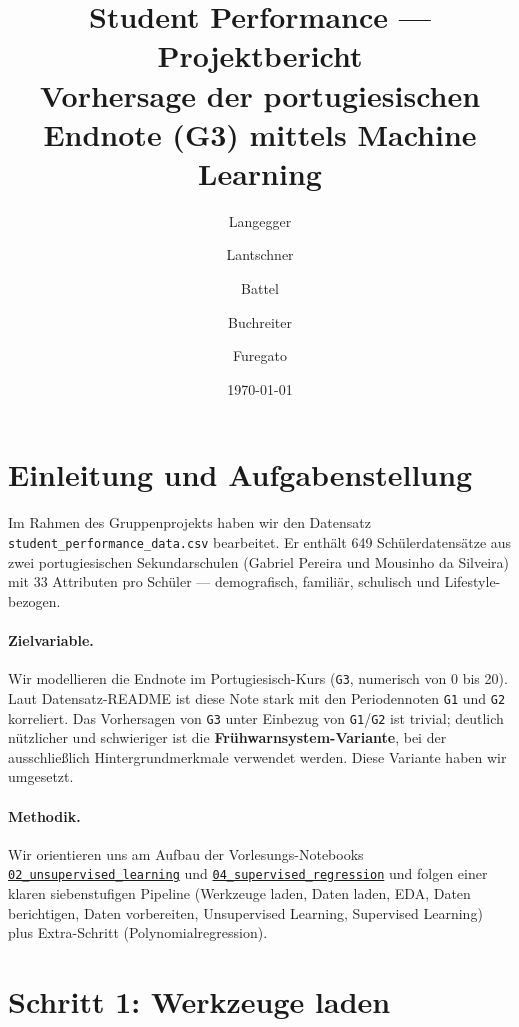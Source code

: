 \documentclass[11pt,a4paper]{article}
\title{Student Performance --- Projektbericht\\
\large Vorhersage der portugiesischen Endnote (G3) mittels Machine Learning}
\author{Langegger \and Lantschner \and Battel \and Buchreiter \and Furegato}
\date{\today}
\begin{document}
\maketitle
\tableofcontents
\newpage

\section{Einleitung und Aufgabenstellung}

Im Rahmen des Gruppenprojekts haben wir den Datensatz \texttt{student\_per\-formance\_data.csv} bearbeitet. Er enthält 649 Schülerdatensätze aus zwei portugiesischen Sekundarschulen (Gabriel Pereira und Mousinho da Silveira) mit 33 Attributen pro Schüler --- demografisch, familiär, schulisch und Lifestyle-bezogen.

\paragraph{Zielvariable.} Wir modellieren die Endnote im Portugiesisch-Kurs (\texttt{G3}, numerisch von 0 bis 20). Laut Datensatz-README ist diese Note stark mit den Periodennoten \texttt{G1} und \texttt{G2} korreliert. Das Vorhersagen von \texttt{G3} unter Einbezug von \texttt{G1}/\texttt{G2} ist trivial; deutlich nützlicher und schwieriger ist die \textbf{Frühwarnsystem-Variante}, bei der ausschließlich Hintergrundmerkmale verwendet werden. Diese Variante haben wir umgesetzt.

\paragraph{Methodik.} Wir orientieren uns am Aufbau der Vorlesungs-Notebooks \href{run:../../data-science-ue-ct/notebooks/02_unsupervised_learning.ipynb}{\texttt{02\_unsupervised\_learning}} und \href{run:../../data-science-ue-ct/notebooks/04_supervised_regression.ipynb}{\texttt{04\_supervised\_regression}} und folgen einer klaren siebenstufigen Pipeline (Werkzeuge laden, Daten laden, EDA, Daten berichtigen, Daten vorbereiten, Unsupervised Learning, Supervised Learning) plus Extra-Schritt (Polynomialregression).

\section{Schritt 1: Werkzeuge laden}
\end{document}

